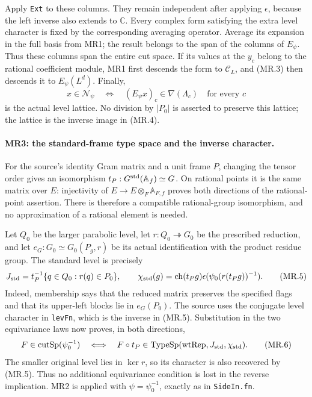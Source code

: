 Apply \texttt{Ext} to these columns. They remain independent after
applying $\epsilon$, because the left inverse also extends to
$\mathbb C$. Every complex form satisfying the extra level character
is fixed by the corresponding averaging operator. Average its
expansion in the full basis from MR1; the result belongs to the span
of the columns of $E_\psi$. Thus these columns span the entire cut
space. If its values at the $y_c$ belong to the rational coefficient
module, MR1 first descends the form to $\mathcal C_L$, and (MR.3)
then descends it to $E_\psi(L^d)$. Finally,
\[
 x\in\mathcal N_\psi
 \quad\Longleftrightarrow\quad
       (E_\psi x)_c\in\nabla(\Lambda_c)\quad\text{for every }c
                                                               \tag{MR.4}
\]
is the actual level lattice. No division by $|P_0|$ is asserted to
preserve this lattice; the lattice is the inverse image in (MR.4).

\paragraph{MR3: the standard-frame type space and the inverse character.}
For the source's identity Gram matrix and a unit frame $P$, changing
the tensor order gives an isomorphism $t_P:G^{\rm std}(\mathbb A_f)
\simeq G$. On rational points it is the same matrix over $E$:
injectivity of $E\to E\otimes_F\mathbb A_{F,f}$ proves both
directions of the rational-point assertion. There is therefore a
compatible rational-group isomorphism, and no approximation of a
rational element is needed.

Let $Q_0$ be the larger parabolic level, let
$r:Q_0\twoheadrightarrow G_0$ be the prescribed reduction, and let
$e_G:G_0\simeq G_0(P_g,r)$ be its actual identification with the
product residue group. The standard level is precisely
\[
 J_{\rm std}=t_P^{-1}\{q\in Q_0:r(q)\in P_0\},\qquad
 \chi_{\rm std}(g)=\operatorname{ch}(t_Pg)
                       \epsilon(\psi_0(r(t_Pg))^{-1}).\tag{MR.5}
\]
Indeed, membership says that the reduced matrix preserves the
specified flags and that its upper-left blocks lie in $e_G(P_0)$.
The source uses the conjugate level character in \texttt{levFn},
which is the inverse in (MR.5). Substitution in the two equivariance
laws now proves, in both directions,
\[
 F\in\operatorname{cutSp}(\psi_0^{-1})
 \quad\Longleftrightarrow\quad
 F\circ t_P\in\operatorname{TypeSp}
                      (\mathrm{wtRep},J_{\rm std},\chi_{\rm std}).
                                                               \tag{MR.6}
\]
The smaller original level lies in $\ker r$, so its character is
also recovered by (MR.5). Thus no additional equivariance condition
is lost in the reverse implication. MR2 is applied with
$\psi=\psi_0^{-1}$, exactly as in \texttt{SideIn.fn}.

